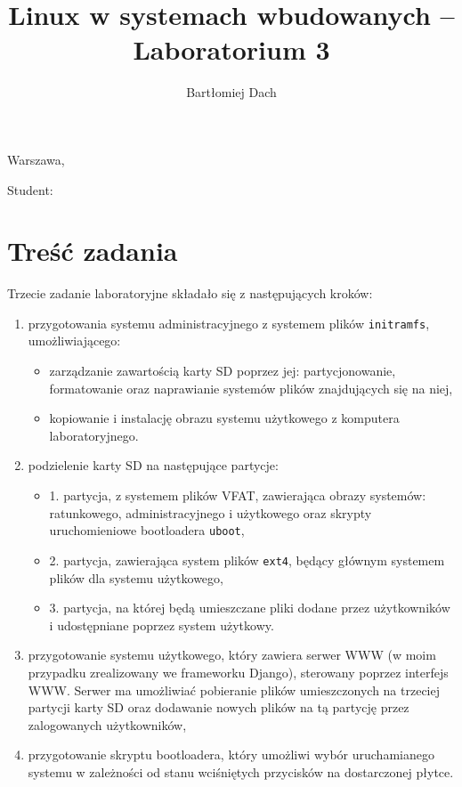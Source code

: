 \documentclass[10pt,a4paper]{article}
\title{Linux w systemach wbudowanych -- Laboratorium 3}
\author{Bartłomiej Dach}
\begin{document}
\makeatletter
\begin{flushright}
	Warszawa, \@date
\end{flushright}
\begin{center}
	\LARGE{\@title}
\end{center}
\vspace{0.25cm}
Student: \@author
\makeatother

\section{Treść zadania}

Trzecie zadanie laboratoryjne składało się z następujących kroków:

\begin{enumerate}
	\item przygotowania systemu administracyjnego z systemem plików \verb+initramfs+,
		umożliwiającego:
		\begin{itemize}
			\item zarządzanie zawartością karty SD poprzez jej: partycjonowanie,
				formatowanie oraz naprawianie systemów plików znajdujących się
				na niej,
			\item kopiowanie i instalację obrazu systemu użytkowego z komputera
				laboratoryjnego.
		\end{itemize}
	\item podzielenie karty SD na następujące partycje:
		\begin{itemize}
			\item 1. partycja, z systemem plików VFAT, zawierająca obrazy systemów:
				ratunkowego, administracyjnego i użytkowego oraz skrypty
				uruchomieniowe bootloadera \verb+uboot+,
			\item 2. partycja, zawierająca system plików \verb+ext4+, będący głównym
				systemem plików dla systemu użytkowego,
			\item 3. partycja, na której będą umieszczane pliki dodane przez
				użytkowników i udostępniane poprzez system użytkowy.
		\end{itemize}
	\item przygotowanie systemu użytkowego, który zawiera serwer WWW (w moim przypadku
		zrealizowany we frameworku Django), sterowany poprzez interfejs WWW. Serwer ma
		umożliwiać pobieranie plików umieszczonych na trzeciej partycji karty SD oraz
		dodawanie nowych plików na tą partycję przez zalogowanych użytkowników,
	\item przygotowanie skryptu bootloadera, który umożliwi wybór uruchamianego systemu
		w zależności od stanu wciśniętych przycisków na dostarczonej płytce.
\end{enumerate}
\end{document}
